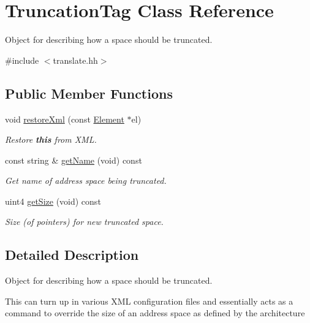 \hypertarget{class_truncation_tag}{}\section{Truncation\+Tag Class Reference}
\label{class_truncation_tag}


Object for describing how a space should be truncated.  




{\ttfamily \#include $<$translate.\+hh$>$}

\subsection*{Public Member Functions}
\begin{DoxyCompactItemize}
\item 
void \mbox{\hyperlink{class_truncation_tag_a3faaea2f7945daf530a209e66890ec0b}{restore\+Xml}} (const \mbox{\hyperlink{class_element}{Element}} $\ast$el)
\begin{DoxyCompactList}\small\item\em Restore {\bfseries{this}} from X\+ML. \end{DoxyCompactList}\item 
const string \& \mbox{\hyperlink{class_truncation_tag_ae4a23e369a872d5aebe8a595530b65a4}{get\+Name}} (void) const
\begin{DoxyCompactList}\small\item\em Get name of address space being truncated. \end{DoxyCompactList}\item 
uint4 \mbox{\hyperlink{class_truncation_tag_a648828324c96d4844ac5f161e3c7e466}{get\+Size}} (void) const
\begin{DoxyCompactList}\small\item\em Size (of pointers) for new truncated space. \end{DoxyCompactList}\end{DoxyCompactItemize}


\subsection{Detailed Description}
Object for describing how a space should be truncated. 

This can turn up in various X\+ML configuration files and essentially acts as a command to override the size of an address space as defined by the architecture 


